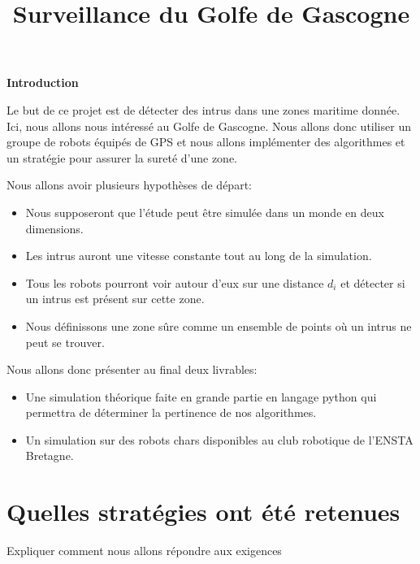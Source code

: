\documentclass[10pt,a4paper]{report}
\begin{document}
\title{\textbf{ {\Huge Surveillance du Golfe de Gascogne}}}

\maketitle

\pagebreak

\begin{LARGE}
\textbf{Introduction}
\end{LARGE}



\bigskip

Le but de ce projet est de détecter des intrus dans une zones maritime donnée. Ici, nous allons nous intéressé au Golfe de Gascogne. Nous allons donc utiliser un groupe de robots équipés de GPS et nous allons implémenter des algorithmes et un stratégie pour assurer la sureté d'une zone. 

\bigskip

Nous allons avoir plusieurs hypothèses de départ:
\begin{itemize}
\item Nous supposeront que l'étude peut être simulée dans un monde en deux dimensions.
\item Les intrus auront une vitesse constante tout au long de la simulation.
\item Tous les robots pourront voir autour d'eux sur une distance $d_{i}$ et détecter si  un intrus est présent sur cette zone.
\item Nous définissons une zone sûre comme un ensemble de points où un intrus ne peut se trouver.
\end{itemize}

\bigskip

Nous allons donc présenter au final deux livrables:
\begin{itemize}
\item Une simulation théorique faite en grande partie en langage python qui permettra de déterminer la pertinence de nos algorithmes.
\item Un simulation sur des robots chars disponibles au club robotique de l'ENSTA Bretagne.
\end{itemize}

\chapter{Quelles stratégies ont été retenues}

Expliquer comment nous allons répondre aux exigences
\end{document}
